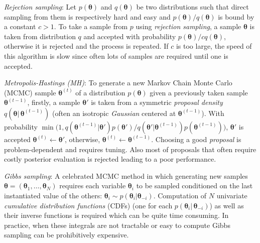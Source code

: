 \emph{Rejection sampling}:
Let $p(\boldsymbol{\theta})$ and $q(\boldsymbol{\theta})$ be two distributions 
such that direct sampling from them is respectively hard and easy
and
$p(\boldsymbol{\theta})/q(\boldsymbol{\theta})$ is bound by a constant $c>1$. 
To take a sample from $p$ using \emph{rejection sampling}, 
a sample $\boldsymbol{\theta}$ is taken from distribution $q$ and accepted with probability $p(\boldsymbol{\theta}) / c q(\boldsymbol{\theta})$, 
otherwise it is rejected and the process is repeated. 
If $c$ is too large, the speed of this algorithm is slow since often lots of samples are required until one is accepted.

\emph{Metropolis-Hastings (MH)}:
To generate a new Markov Chain Monte Carlo (MCMC) sample $\boldsymbol{\theta}^{(t)}$ of a distribution $p(\boldsymbol{\theta})$ given a previously taken sample $\boldsymbol{\theta}^{(t-1)}$, 
firstly, a sample $\boldsymbol{\theta}'$ is taken 
from a symmetric \emph{proposal density} $q(\boldsymbol{\theta} |\, \boldsymbol{\theta}^{(t-1)})$ 
(often an isotropic \emph{Gaussian} centered at $\boldsymbol{\theta}^{(t-1)}$). 
With probability $\min \big(1, q(\boldsymbol{\theta}^{(t-1)}|\boldsymbol{\theta}')p(\boldsymbol{\theta}')/q(\boldsymbol{\theta}'|\boldsymbol{\theta}^{(t-1)})p(\boldsymbol{\theta}^{(t-1)}) \big)$, 
$\boldsymbol{\theta}'$ is accepted $\boldsymbol{\theta}^{(t)} \leftarrow \boldsymbol{\theta}'$, otherwise, $\boldsymbol{\theta}^{(t)} \leftarrow \boldsymbol{\theta}^{(t-1)}$. 
Choosing a good \emph{proposal} is problem-dependent and requires tuning. Also most of proposals that often require costly posterior evaluation is rejected leading to a poor performance. 


\emph{Gibbs sampling}:
A celebrated MCMC method in which generating new samples $\boldsymbol{\theta} = (\boldsymbol{\theta}_1, \ldots, \boldsymbol{\theta}_N)$ requires each variable $\boldsymbol\theta_i$ to be sampled conditioned on
the last instantiated value of the others:
$\boldsymbol{\theta}_i \sim p(\boldsymbol{\theta}_i | \boldsymbol{\theta}_{-i})$. 
Computation of $N$ univariate \emph{cumulative distribution functions} (CDFs) 
(one for each $p(\boldsymbol{\theta}_i | \, \boldsymbol{\theta}_{-i})$) as well as their inverse functions is required which can be quite time consuming. 
In practice, when these integrals are not tractable or easy to compute Gibbs sampling can be prohibitively expensive.   

